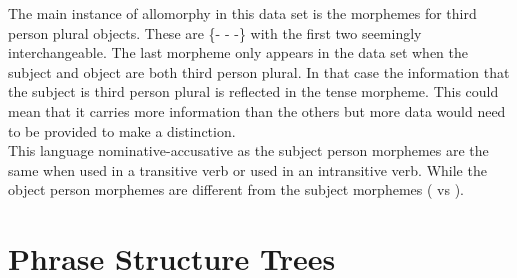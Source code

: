 \documentclass[20pt]{article}
\newcommand{\ipa}[1]{\textipa{#1}}
\begin{document}
\vspace{1em}

The main instance of allomorphy in this data set is the morphemes for third
person plural objects. These are \{\ipa{ra}- \ipa{ja}- \ipa{jara}-\} with the first two
seemingly interchangeable. The last morpheme only appears in the data set when the
subject and object are both third person plural. In that case the information
that the subject is third person plural is reflected in the tense morpheme. This
could mean that it carries more information than the others but more data would
need to be provided to make a distinction. \\

This language nominative-accusative as the subject person morphemes are the same
when used in a transitive verb or used in an intransitive verb. While the object
person morphemes are different from the subject morphemes (\ipa{Na} vs
\ipa{na}).

\section{Phrase Structure Trees}


\end{document}
